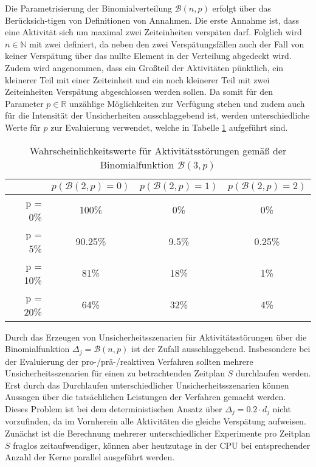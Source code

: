 Die Parametrisierung der Binomialverteilung $\mathcal{B}(n, p)$ erfolgt über das Berücksich-tigen von Definitionen von Annahmen. Die erste Annahme ist, dass eine Aktivität sich um maximal zwei Zeiteinheiten verspäten darf. Folglich wird $n \in \mathbb{N}$ mit zwei definiert, da neben den zwei Verspätungsfällen auch der Fall von keiner Verspätung über das nullte Element in der Verteilung abgedeckt wird. Zudem wird angenommen, dass ein Großteil der Aktivitäten pünktlich, ein kleinerer Teil mit einer Zeiteinheit und ein noch kleinerer Teil mit zwei Zeiteinheiten Verspätung abgeschlossen werden sollen. Da somit für den Parameter $p \in \mathbb{R}$ unzählige Möglichkeiten zur Verfügung stehen und zudem auch für die Intensität der Unsicherheiten ausschlaggebend ist, werden unterschiedliche Werte für $p$ zur Evaluierung verwendet, welche in Tabelle \ref{tab:binomial_uncertainty} aufgeführt sind. 

\begin{table}[H]
\centering
\begin{tabular}{r|ccc}
     & $p(\mathcal{B}(2, p) = 0)$ & $p(\mathcal{B}(2, p) = 1) $ & $p(\mathcal{B}(2, p) = 2)$ \\ \hline
p = 0\%  & 100\% & 0\% & 0\% \\
p = 5\%  & 90.25\% & 9.5\% & 0.25\%  \\
p = 10\% & 81\% & 18\% & 1\%  \\
p = 20\% & 64\% & 32\% & 4\% 
\end{tabular}
\caption{Wahrscheinlichkeitswerte für Aktivitätsstörungen gemäß der Binomialfunktion $\mathcal{B}(3, p)$}
\label{tab:binomial_uncertainty}
\end{table}

Durch das Erzeugen von Unsicherheitsszenarien für Aktivitätsstörungen über die Binomialfunktion $\Delta_j = \mathcal{B}(n, p)$ ist der Zufall ausschlaggebend. Insbesondere bei der Evaluierung der pro-/prä-/reaktiven  Verfahren sollten mehrere Unsicherheitsszenarien für einen zu betrachtenden Zeitplan $S$ durchlaufen werden. Erst durch das Durchlaufen unterschiedlicher Unsicherheitsszenarien können Aussagen über die tatsächlichen Leistungen der Verfahren gemacht werden. Dieses Problem ist bei dem deterministischen Ansatz über $\Delta_j = 0.2 \cdot d_j$ nicht vorzufinden, da im Vornherein alle Aktivitäten die gleiche Verspätung aufweisen. Zunächst ist die Berechnung mehrerer unterschiedlicher Experimente pro Zeitplan $S$ fraglos zeitaufwendiger, können aber heutzutage in der CPU bei entsprechender Anzahl der Kerne parallel ausgeführt werden.

